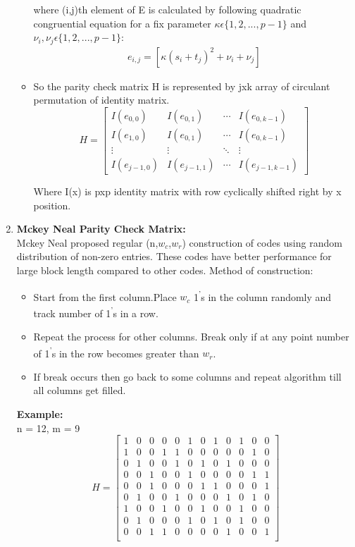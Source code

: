 \documentclass[twopage,12pt,a4paper]{report}
\begin{document}
\begin{raggedright}
\begin{enumerate}
\begin{itemize}
where (i,j)th element of E is calculated by following quadratic congruential equation for a fix parameter
$\kappa\epsilon\{1,2,...,p-1\} $ and $\nu_i,\nu_j\epsilon\{1,2,...,p-1\} $: 
\begin{align}
 e_{i,j}=[\kappa(s_i+t_j)^2 + \nu_i +\nu_j] 
\end{align}
\item So the parity check matrix H is represented by jxk array of circulant permutation of identity matrix. 
\[
 H= \left[ \begin{array}{cccc}
I(e_{0,0}) & I(e_{0,1}) & \cdots & I(e_{0,k-1}) \\
I(e_{1,0}) & I(e_{0,1}) & \cdots & I(e_{0,k-1}) \\
\vdots & \vdots & \ddots & \vdots \\
I(e_{j-1,0}) & I(e_{j-1,1}) & \cdots & I(e_{j-1,k-1}) 
\end{array} \right] \]

 
Where I(x) is pxp identity matrix with row cyclically shifted right by x position.
\end{itemize}


\item \textbf{Mckey Neal Parity Check Matrix: }\\
Mckey Neal proposed regular (n,$w_c$,$w_r$) construction of codes using random distribution of non-zero entries. These codes have better performance for large block length compared to other codes.
Method of construction:
\begin{itemize} 
\item Start from the first column.Place $w_c$ 1\textsuperscript{'}s in the column randomly and track number of 1\textsuperscript{'}s in a row.
\item Repeat the process for other columns. Break only if at any point number of 1\textsuperscript{'}s in the row becomes greater than $w_r$.
\item If break occurs then go back to some columns and repeat algorithm till all columns get filled.
\end{itemize} 
\textbf{Example:}\\
 n = 12, m = 9  
  \[H=
 \left[ \begin{array}{cccccccccccc}
1 & 0 & 0 & 0 & 0 & 1 & 0 & 1 & 0 & 1 & 0 & 0 \\
1 & 0 & 0 & 1 & 1 & 0 & 0 & 0 & 0 & 0 & 1 & 0 \\
0 & 1 & 0 & 0 & 1 & 0 & 1 & 0 & 1 & 0 & 0 & 0 \\
0 & 0 & 1 & 0 & 0 & 1 & 0 & 0 & 0 & 0 & 1 & 1 \\
0 & 0 & 1 & 0 & 0 & 0 & 1 & 1 & 0 & 0 & 0 & 1 \\
0 & 1 & 0 & 0 & 1 & 0 & 0 & 0 & 1 & 0 & 1 & 0\\
1 & 0 & 0 & 1 & 0 & 0 & 1 & 0 & 0 & 1 & 0 & 0 \\
0 & 1 & 0 & 0 & 0 & 1 & 0 & 1 & 0 & 1 & 0 & 0 \\
0 & 0 & 1 & 1 & 0 & 0 & 0 & 0 & 1 & 0 & 0 & 1 \\ \end{array} \right]  
\] 


\end{enumerate}
\end{raggedright}
\end{document}
